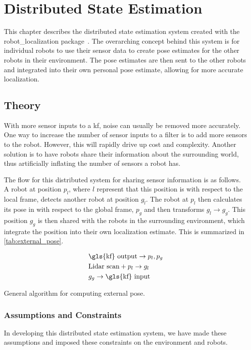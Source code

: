 \documentclass[thesis.tex]{subfile}
\begin{document}
\chapter{Distributed State Estimation} \label{ch:Distributed State Estimation}
This chapter describes the distributed state estimation system created with the robot\_localization package~\cite{MooreStouch2014, Moore}. The overarching concept behind this system is for individual robots to use their sensor data to create pose estimates for the other robots in their environment. The pose estimates are then sent to the other robots and integrated into their own personal pose estimate, allowing for more accurate localization.
  
\section{Theory} \label{Theory}
With more sensor inputs to a \gls{kf}, noise can usually be removed more accurately. One way to increase the number of sensor inputs to a filter is to add more sensors to the robot. However, this will rapidly drive up cost and complexity. Another solution is to have robots share their information about the surrounding world, thus artificially inflating the number of sensors a robot has.

The flow for this distributed system for sharing sensor information is as follows. A robot at position $p_l$, where $l$ represent that this position is with respect to the local frame, detects another robot at position $g_l$. The robot at $p_l$ then calculates its pose in with respect to the global frame, $p_g$ and then transforms $g_l \rightarrow g_g$. This position $g_g$ is then shared with the robots in the surrounding environment, which integrate the position into their own localization estimate. This is summarized in \cref{tab:external_pose}.

\begin{table}[htbp]
\centering
\begin{align}
&\text{\gls{kf} output} \rightarrow p_l, p_g \\
&\text{Lidar scan} + p_l \rightarrow g_l \\
&g_g \rightarrow \text{\gls{kf} input}
\end{align}
\caption{General algorithm for computing external pose.}
\label{tab:external_pose}
\end{table}

\subsection{Assumptions and Constraints}
In developing this distributed state estimation system, we have made these assumptions and imposed these constraints on the environment and robots.
\end{document}
